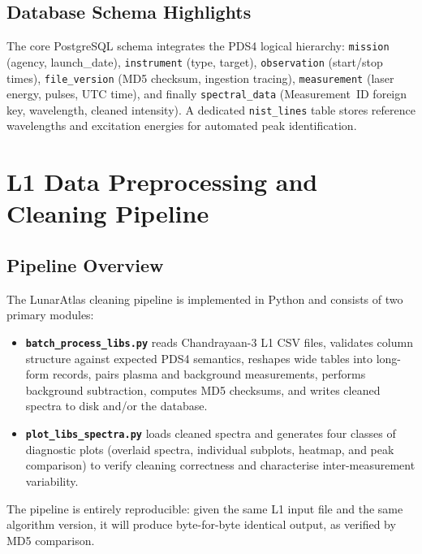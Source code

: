 \documentclass[a4paper,twocolumn,10pt]{article}
\begin{document}
\subsection{Database Schema Highlights}

The core PostgreSQL schema integrates the PDS4 logical hierarchy: \texttt{mission} (agency, launch\_date), \texttt{instrument} (type, target), \texttt{observation} (start/stop times), \texttt{file\_version} (MD5 checksum, ingestion tracing), \texttt{measurement} (laser energy, pulses, UTC time), and finally \texttt{spectral\_data} (Measurement~ID foreign key, wavelength, cleaned intensity). A dedicated \texttt{nist\_lines} table stores reference wavelengths and excitation energies for automated peak identification.
\section{L1 Data Preprocessing and Cleaning Pipeline}
\label{sec:preprocessing}

\subsection{Pipeline Overview}

The LunarAtlas cleaning pipeline is implemented in Python and consists
of two primary modules:

\begin{itemize}[nosep,leftmargin=*]
  \item \textbf{\texttt{batch\_process\_libs.py}} reads Chandrayaan-3
    L1 CSV files, validates column structure against expected PDS4
    semantics, reshapes wide tables into long-form records, pairs
    plasma and background measurements, performs background
    subtraction, computes MD5 checksums, and writes cleaned spectra to
    disk and/or the database.

  \item \textbf{\texttt{plot\_libs\_spectra.py}} loads cleaned spectra
    and generates four classes of diagnostic plots (overlaid spectra,
    individual subplots, heatmap, and peak comparison) to verify
    cleaning correctness and characterise inter-measurement variability.
\end{itemize}

The pipeline is entirely reproducible: given the same L1 input file
and the same algorithm version, it will produce byte-for-byte identical
output, as verified by MD5 comparison.
\end{document}
